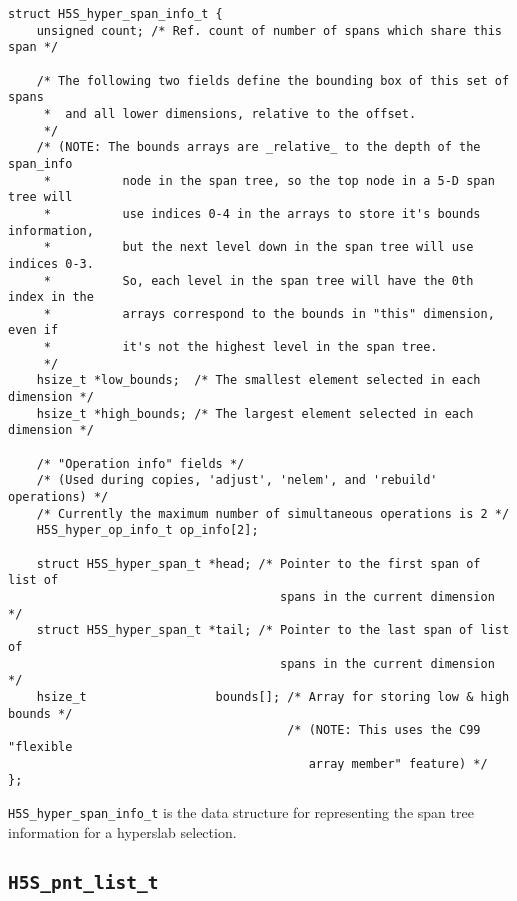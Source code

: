 \documentclass[../HDF5_RFC.tex]{subfiles}
\begin{document}
\begin{verbatim}
struct H5S_hyper_span_info_t {
    unsigned count; /* Ref. count of number of spans which share this span */

    /* The following two fields define the bounding box of this set of spans
     *  and all lower dimensions, relative to the offset.
     */
    /* (NOTE: The bounds arrays are _relative_ to the depth of the span_info
     *          node in the span tree, so the top node in a 5-D span tree will
     *          use indices 0-4 in the arrays to store it's bounds information,
     *          but the next level down in the span tree will use indices 0-3.
     *          So, each level in the span tree will have the 0th index in the
     *          arrays correspond to the bounds in "this" dimension, even if
     *          it's not the highest level in the span tree.
     */
    hsize_t *low_bounds;  /* The smallest element selected in each dimension */
    hsize_t *high_bounds; /* The largest element selected in each dimension */

    /* "Operation info" fields */
    /* (Used during copies, 'adjust', 'nelem', and 'rebuild' operations) */
    /* Currently the maximum number of simultaneous operations is 2 */
    H5S_hyper_op_info_t op_info[2];

    struct H5S_hyper_span_t *head; /* Pointer to the first span of list of
                                      spans in the current dimension */
    struct H5S_hyper_span_t *tail; /* Pointer to the last span of list of
                                      spans in the current dimension */
    hsize_t                  bounds[]; /* Array for storing low & high bounds */
                                       /* (NOTE: This uses the C99 "flexible
                                          array member" feature) */
};
\end{verbatim}

\texttt{H5S\_hyper\_span\_info\_t} is the data structure for representing the span tree
information for a hyperslab selection.

\subsection{\texttt{H5S\_pnt\_list\_t}}
\label{apdx:h5s_struct_h5s_pnt_list_t}
\end{document}
